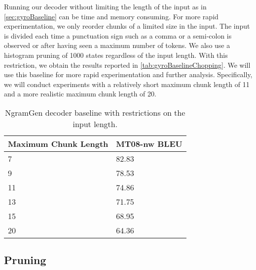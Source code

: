 Running our decoder without limiting the length of the input
as in \autoref{sec:gyroBaseline} can be time and memory consuming.
For more rapid experimentation, we only reorder chunks of a limited
size in the
input. The input is divided each time a punctuation sign such
as a comma or a semi-colon is observed or after having seen a maximum
number of tokens. We also use a histogram pruning of 1000 states
regardless of the input length.
With this restriction, we obtain the results reported
in \autoref{tab:gyroBaselineChopping}. We will use this baseline
for more rapid experimentation and further analysis. Specifically,
we will conduct experiments with a relatively short maximum chunk
length of 11 and a more realistic maximum chunk length of 20.

\begin{table}
  \begin{center}
  \begin{tabular}{l|l}
    Maximum Chunk Length & MT08-nw BLEU \\
    \hline
    7 & 82.83 \\
    9 & 78.53 \\
    11 & 74.86 \\
    13 & 71.75 \\
    15 & 68.95 \\
    20 & 64.36 \\
  \end{tabular}
  \caption{NgramGen decoder baseline with restrictions on the input length.}
  \label{tab:gyroBaselineChopping}
  \end{center}
\end{table}

\subsection{Pruning}

